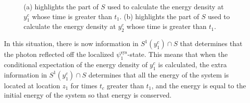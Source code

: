 \documentclass[12pt]{report}
\begin{document}
\begin{figure}[ht!]


\vspace*{2px}
\caption[Photon measurements for energy density calculations at $y^c_1$ and $y^c_2$]{(a) highlights the part of $S$ used to calculate the energy density at $y^c_1$ whose time is greater than $t_1$. (b) highlights the part of $S$ used to calculate the energy density at $y^c_2$ whose time is greater than $t_1$.}
\label{TM4}
\end{figure}

In this situation, there is now information in $S^1(y^c_1)\cap S$ that determines that the photon reflected off the localized $\psi_1^\text{sys}$-state. This means that when the conditional expectation of the energy density of $y^c_1$ is calculated, the extra information in $S^1(y^c_1)\cap S$ determines that all the energy of the system is located at location $z_1$ for times $t_c$ greater than $t_1$, and the energy is equal to the initial energy of the system so that energy is conserved.
\end{document}
